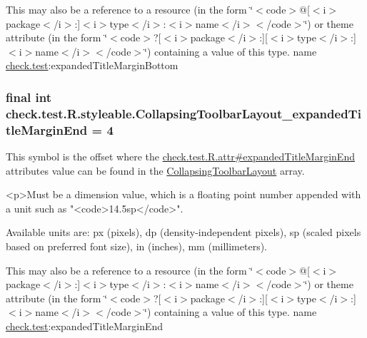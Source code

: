 This may also be a reference to a resource (in the form \char`\"{}$<$code$>$@\mbox{[}$<$i$>$package$<$/i$>$\+:\mbox{]}$<$i$>$type$<$/i$>$\+:$<$i$>$name$<$/i$>$$<$/code$>$\char`\"{}) or theme attribute (in the form \char`\"{}$<$code$>$?\mbox{[}$<$i$>$package$<$/i$>$\+:\mbox{]}\mbox{[}$<$i$>$type$<$/i$>$\+:\mbox{]}$<$i$>$name$<$/i$>$$<$/code$>$\char`\"{}) containing a value of this type.  name \hyperlink{namespacecheck_1_1test}{check.\+test}\+:expanded\+Title\+Margin\+Bottom \hypertarget{classcheck_1_1test_1_1_r_1_1styleable_a7c45bb4250b94c50e63037e285cbce79}{}
\subsubsection[{Collapsing\+Toolbar\+Layout\+\_\+expanded\+Title\+Margin\+End}]{\setlength{\rightskip}{0pt plus 5cm}final int check.\+test.\+R.\+styleable.\+Collapsing\+Toolbar\+Layout\+\_\+expanded\+Title\+Margin\+End = 4\hspace{0.3cm}{\ttfamily [static]}}\label{classcheck_1_1test_1_1_r_1_1styleable_a7c45bb4250b94c50e63037e285cbce79}
This symbol is the offset where the \hyperlink{classcheck_1_1test_1_1_r_1_1attr_ac3625e75ee780dbfcc80b6559140ef24}{check.\+test.\+R.\+attr\#expanded\+Title\+Margin\+End} attribute\textquotesingle{}s value can be found in the \hyperlink{classcheck_1_1test_1_1_r_1_1styleable_a0c512120c75d0ddac20063034a72db17}{Collapsing\+Toolbar\+Layout} array.

\begin{DoxyVerb}      <p>Must be a dimension value, which is a floating point number appended with a unit such as "<code>14.5sp</code>".
\end{DoxyVerb}
 Available units are\+: px (pixels), dp (density-\/independent pixels), sp (scaled pixels based on preferred font size), in (inches), mm (millimeters). 

This may also be a reference to a resource (in the form \char`\"{}$<$code$>$@\mbox{[}$<$i$>$package$<$/i$>$\+:\mbox{]}$<$i$>$type$<$/i$>$\+:$<$i$>$name$<$/i$>$$<$/code$>$\char`\"{}) or theme attribute (in the form \char`\"{}$<$code$>$?\mbox{[}$<$i$>$package$<$/i$>$\+:\mbox{]}\mbox{[}$<$i$>$type$<$/i$>$\+:\mbox{]}$<$i$>$name$<$/i$>$$<$/code$>$\char`\"{}) containing a value of this type.  name \hyperlink{namespacecheck_1_1test}{check.\+test}\+:expanded\+Title\+Margin\+End \hypertarget{classcheck_1_1test_1_1_r_1_1styleable_a9998f98d1bc4ccd614b3102b27346107}{}

